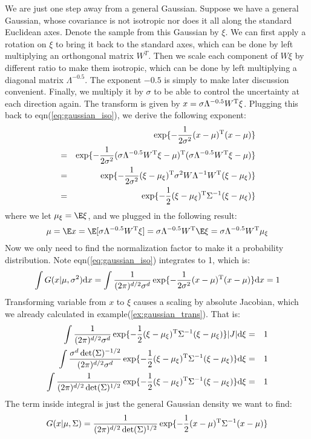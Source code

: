 We are just one step away from a general Gaussian. Suppose we 
have a general Gaussian, whose covariance is not isotropic nor 
does it all along the standard Euclidean axes. Denote the sample
from this Gaussian by $\xi$. We can first apply 
a rotation on $\xi$ to bring it back to the standard axes,
which can be done by left multiplying an
orthongonal matrix $W^T$. Then we scale each component of $W\xi$
by different ratio to make them isotropic, which can be done 
by left multiplying a diagonal matrix $\Lambda^{-0.5}$. The 
exponent $-0.5$ is simply to make later discussion convenient. 
Finally, we multiply it by $\sigma$ to be able to control 
the uncertainty at each direction again. The transform is 
given by $x = \sigma \Lambda^{-0.5}W^\mathrm{T} \xi$. Plugging
this back to eqn(\ref{eq:gaussian_iso}), we derive the following
exponent:
\begin{eqnarray}
	&&\exp\{ -\frac{1}{2\sigma^2} (x-\mu)^\mathrm{T}(x-\mu)\} \\
	&=& \exp\{ -\frac{1}{2\sigma^2} 
	(\sigma \Lambda^{-0.5}W^\mathrm{T} \xi-\mu)^\mathrm{T}(\sigma \Lambda^{-0.5}W^\mathrm{T} \xi-\mu)\} \\
	&=& \exp\{ -\frac{1}{2\sigma^2} 
	(\xi-\mu_\xi)^\mathrm{T}\sigma^2W\Lambda^{-1}W^\mathrm{T}(\xi-\mu_\xi)\} \\
	&=& \exp\{ -\frac{1}{2} 
	(\xi-\mu_\xi)^\mathrm{T}\Sigma^{-1}(\xi-\mu_\xi)\} 
\end{eqnarray}
where we let $\mu_\xi = \E\xi$, and we plugged in the following result:
\begin{equation}
	\mu = \E x = \E[\sigma \Lambda^{-0.5}\tran{W} \xi]
	=\sigma \Lambda^{-0.5}\tran{W} \E \xi
	=\sigma \Lambda^{-0.5}\tran{W} \mu_\xi
\end{equation}
Now we only need to find the normalization factor to make it a 
probability distribution. 
Note eqn(\ref{eq:gaussian_iso}) integrates to 1, which is:
\begin{equation}
	\int G(x|\mu, \sigma^2)\mathrm{d}x =  \int \frac{1}{(2\pi)^{d/2}\sigma^d}
	\exp\{ -\frac{1}{2\sigma^2} (x-\mu)^\mathrm{T}(x-\mu)\} \mathrm{d}x = 1
\end{equation}
Transforming variable from $x$ to $\xi$ causes a scaling by absolute Jacobian, 
which we already calculated in example(\ref{ex:gaussian_trans}). 
That is:
\begin{eqnarray}
	\int \frac{1}{(2\pi)^{d/2}\sigma^d}
	\exp\{ -\frac{1}{2} (\xi-\mu_\xi)^\mathrm{T}\Sigma^{-1}(\xi-\mu_\xi)\} 
	|J| \mathrm{d}\xi &=& 1 \\
	\int \frac{\sigma^d \det(\Sigma)^{-1/2}}{(2\pi)^{d/2}\sigma^d}
	\exp\{ -\frac{1}{2} (\xi-\mu_\xi)^\mathrm{T}\Sigma^{-1}(\xi-\mu_\xi)\} 
	 \mathrm{d}\xi &=& 1 \\
	 \int \frac{1}{(2\pi)^{d/2}\det(\Sigma)^{1/2}}
	\exp\{ -\frac{1}{2} (\xi-\mu_\xi)^\mathrm{T}\Sigma^{-1}(\xi-\mu_\xi)\} 
	 \mathrm{d}\xi &=& 1  
\end{eqnarray}
The term inside integral is just the general Gaussian density we want 
to find:
\begin{equation}
	G(x|\mu, \Sigma) = \frac{1}{(2\pi)^{d/2}\det(\Sigma)^{1/2}}
	\exp\{ -\frac{1}{2} (x-\mu)^\mathrm{T}\Sigma^{-1}(x-\mu)\} 
	\label{eq:gaussian_gen}
\end{equation}

